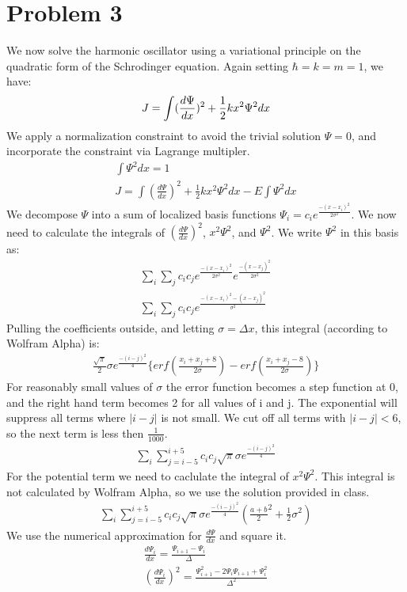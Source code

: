\documentclass[a4paper,10pt]{article}
\numberwithin{equation}{section}
\begin{document}
\section{Problem 3}
We now solve the harmonic oscillator using a variational principle on the quadratic form of the Schrodinger equation.
Again setting $\hbar =k=m=1$, we have:
\begin{equation}
J=\int (\frac{d\Psi }{dx})^{2}+\frac{1}{2}kx^2\Psi ^2 dx\\
\end{equation}
We apply a normalization constraint to avoid the trivial solution $\Psi=0$, and incorporate the constraint via Lagrange multipler.
\begin{gather}
\int \Psi^2 dx = 1\\
J=\int (\frac{d\Psi }{dx})^{2}+\frac{1}{2}kx^2\Psi ^2 dx - E\int \Psi^2 dx
\end{gather}
We decompose $\Psi$ into a sum of localized basis functions $\Psi_i=c_ie^{\frac{-(x-x_i)^2}{2\sigma ^2}}$.
We now need to calculate the integrals of $(\frac{d\Psi }{dx})^{2}$, $x^2\Psi ^2$, and $\Psi^2$.
We write $\Psi^2$ in this basis as:
\begin{gather}
 \sum_{i}\sum_{j}c_ic_je^{\frac{-(x-x_i)^2}{2\sigma ^2}}e^{\frac{-(x-x_j)^2}{2\sigma ^2}}\\
 \sum_{i}\sum_{j}c_ic_je^{\frac{-(x-x_i)^2-(x-x_j)^2}{\sigma ^2}}
\end{gather}
Pulling the coefficients outside, and letting $\sigma=\Delta x$, this integral (according to Wolfram Alpha) is:
\begin{gather}
\frac{\sqrt{\pi}}{2}\sigma e^{\frac{-(i-j)^2}{4}}\{erf(\frac{x_i+x_j+8}{2\sigma})-erf(\frac{x_i+x_j-8}{2\sigma})\}
\end{gather}
For reasonably small values of $\sigma$ the error function becomes a step function at 0, and the right hand term becomes 2 for all values of i and j.
The  exponential will suppress all terms where $|i-j|$ is not small. We cut off all terms with  $|i-j|<6$, so the next term is less then $\frac{1}{1000}$.
\begin{gather}
 \sum_{i}\sum_{j=i-5}^{i+5}c_ic_j\sqrt{\pi}\sigma e^{\frac{-(i-j)^2}{4}}
\end{gather}
For the potential term we need to caclulate the integral of $x^2\Psi ^2$. 
This integral is not calculated by Wolfram Alpha, so we use the solution provided in class.
\begin{gather}
 \sum_{i}\sum_{j=i-5}^{i+5}c_ic_j\sqrt{\pi}\sigma e^{\frac{-(i-j)^2}{4}}(\frac{a+b}{2}^2+\frac{1}{2}\sigma ^2)
\end{gather}
We use the numerical approximation for $\frac{d\Psi}{dx}$ and square it.
\begin{gather}
 \frac{d \Psi_{i}}{dx}=\frac{\Psi_{i+1}-\Psi_{i}}{\Delta}\\
 (\frac{d \Psi_{i}}{dx})^2=\frac{\Psi_{i+1}^2-2\Psi_{i}\Psi_{i+1}+\Psi_{i}^2}{\Delta ^2}\\
\end{gather}
\end{document}
